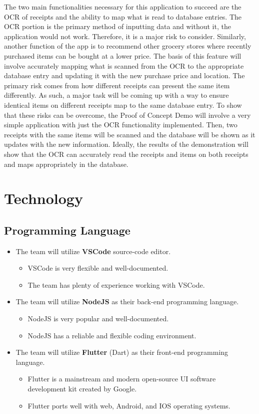 \documentclass{article}
\begin{document}
The two main functionalities necessary for this application to succeed are the OCR of receipts
and the ability to map what is read to database entries. The OCR portion is the primary method of inputting data
and without it, the application would not work. Therefore, it is a major risk to consider. Similarly, another
function of the app is to recommend other grocery stores where recently purchased items can be bought at a lower price.
The basis of this feature will involve accurately mapping what is scanned from the OCR to the appropriate database entry and
updating it with the new purchase price and location. The primary risk comes from how different receipts can present
the same item differently. As such, a major task will be coming up with a way to ensure identical items on different receipts
map to the same database entry. To show that these risks can be overcome, the Proof of Concept Demo will involve a very
simple application with just the OCR functionality implemented. Then, two receipts with the same items will be scanned
and the database will be shown as it updates with the new information. Ideally, the results of the demonstration
will show that the OCR can accurately read the receipts and items on both receipts and maps appropriately in the database.

\section{Technology}

\subsection{Programming Language}
    \begin{itemize}
        \item The team will utilize \textbf{VSCode} source-code editor.
        \begin{itemize}
            \item VSCode is very flexible and well-documented.
            \item The team has plenty of experience working with VSCode.
        \end{itemize}
        \item The team will utilize \textbf{NodeJS} as their back-end programming language.
        \begin{itemize}
            \item NodeJS is very popular and well-documented.
            \item NodeJS has a reliable and flexible coding environment.
        \end{itemize}
        \item The team will utilize \textbf{Flutter} (Dart) as their front-end programming language.
        \begin{itemize}
            \item Flutter is a mainstream and modern open-source UI software development kit created by Google.
            \item Flutter ports well with web, Android, and IOS operating systems.
        \end{itemize}
    \end{itemize}
\end{document}
